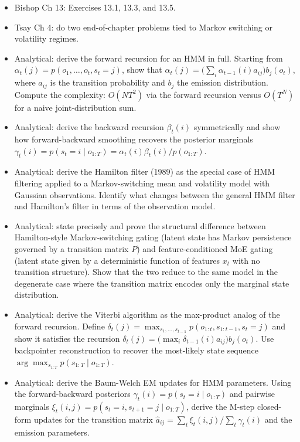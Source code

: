 \begin{itemize}
\tightlist
\item
  Bishop Ch 13: Exercises 13.1, 13.3, and 13.5.
\item
  Tsay Ch 4: do two end-of-chapter problems tied to Markov switching or
  volatility regimes.
\item
  Analytical: derive the forward recursion for an HMM in full. Starting
  from \(\alpha_t(j) = p(o_1, \ldots, o_t, s_t = j)\), show that
  \(\alpha_t(j) = \big(\sum_i \alpha_{t-1}(i) a_{ij}\big) b_j(o_t)\),
  where \(a_{ij}\) is the transition probability and \(b_j\) the
  emission distribution. Compute the complexity: \(O(NT^2)\) via the
  forward recursion versus \(O(T^N)\) for a naive joint-distribution
  sum.
\item
  Analytical: derive the backward recursion \(\beta_t(i)\) symmetrically
  and show how forward-backward smoothing recovers the posterior
  marginals
  \(\gamma_t(i) = p(s_t = i \mid o_{1:T}) = \alpha_t(i) \beta_t(i) / p(o_{1:T})\).
\item
  Analytical: derive the Hamilton filter (1989) as the special case of
  HMM filtering applied to a Markov-switching mean and volatility model
  with Gaussian observations. Identify what changes between the general
  HMM filter and Hamilton's filter in terms of the observation model.
\item
  Analytical: state precisely and prove the structural difference
  between Hamilton-style Markov-switching gating (latent state has
  Markov persistence governed by a transition matrix \(P\)) and
  feature-conditioned MoE gating (latent state given by a deterministic
  function of features \(x_t\) with no transition structure). Show that
  the two reduce to the same model in the degenerate case where the
  transition matrix encodes only the marginal state distribution.
\item
  Analytical: derive the Viterbi algorithm as the max-product analog of
  the forward recursion. Define
  \(\delta_t(j) = \max_{s_1, \ldots, s_{t-1}} p(o_{1:t}, s_{1:t-1}, s_t = j)\)
  and show it satisfies the recursion
  \(\delta_t(j) = \big(\max_i \delta_{t-1}(i) a_{ij}\big) b_j(o_t)\).
  Use backpointer reconstruction to recover the most-likely state
  sequence \(\arg\max_{s_{1:T}} p(s_{1:T} \mid o_{1:T})\).
\item
  Analytical: derive the Baum-Welch EM updates for HMM parameters. Using
  the forward-backward posteriors
  \(\gamma_t(i) = p(s_t = i \mid o_{1:T})\) and pairwise marginals
  \(\xi_t(i,j) = p(s_t = i, s_{t+1} = j \mid o_{1:T})\), derive the
  M-step closed-form updates for the transition matrix
  \(\hat{a}_{ij} = \sum_t \xi_t(i,j) / \sum_t \gamma_t(i)\) and the
  emission parameters.
\end{itemize}

